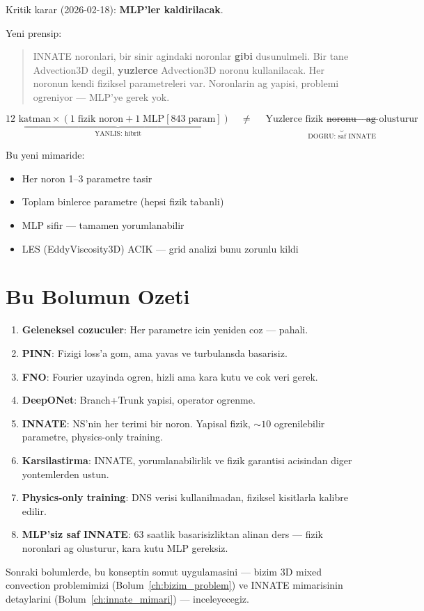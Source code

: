 Kritik karar (2026-02-18): \textbf{MLP'ler kaldirilacak}.

Yeni prensip:
\begin{quote}
INNATE noronlari, bir sinir agindaki noronlar \textbf{gibi} dusunulmeli.
Bir tane Advection3D degil, \textbf{yuzlerce} Advection3D noronu kullanilacak.
Her noronun kendi fiziksel parametreleri var.
Noronlarin ag yapisi, problemi ogreniyor --- MLP'ye gerek yok.
\end{quote}

\begin{equation}
\underbrace{\text{12 katman} \times (1\;\text{fizik noron} + 1\;\text{MLP}[843\;\text{param}])}_{\text{YANLIS: hibrit}}
\quad\neq\quad
\underbrace{\text{Yuzlerce fizik noronu} \to \text{ag olusturur}}_{\text{DOGRU: saf INNATE}}
\end{equation}

Bu yeni mimaride:
\begin{itemize}
\item Her noron 1--3 parametre tasir
\item Toplam binlerce parametre (hepsi fizik tabanli)
\item MLP sifir --- tamamen yorumlanabilir
\item LES (EddyViscosity3D) ACIK --- grid analizi bunu zorunlu kildi
\end{itemize}


\section{Bu Bolumun Ozeti}

\begin{enumerate}
\item \textbf{Geleneksel cozuculer}: Her parametre icin yeniden coz --- pahali.
\item \textbf{PINN}: Fizigi loss'a gom, ama yavas ve turbulansda basarisiz.
\item \textbf{FNO}: Fourier uzayinda ogren, hizli ama kara kutu ve cok veri gerek.
\item \textbf{DeepONet}: Branch+Trunk yapisi, operator ogrenme.
\item \textbf{INNATE}: NS'nin her terimi bir noron. Yapisal fizik, $\sim10$ ogrenilebilir parametre, physics-only training.
\item \textbf{Karsilastirma}: INNATE, yorumlanabilirlik ve fizik garantisi acisindan diger yontemlerden ustun.
\item \textbf{Physics-only training}: DNS verisi kullanilmadan, fiziksel kisitlarla kalibre edilir.
\item \textbf{MLP'siz saf INNATE}: 63 saatlik basarisizliktan alinan ders --- fizik noronlari ag olusturur, kara kutu MLP gereksiz.
\end{enumerate}

Sonraki bolumlerde, bu konseptin somut uygulamasini --- bizim 3D mixed convection problemimizi (Bolum~\ref{ch:bizim_problem}) ve INNATE mimarisinin detaylarini (Bolum~\ref{ch:innate_mimari}) --- inceleyecegiz.
